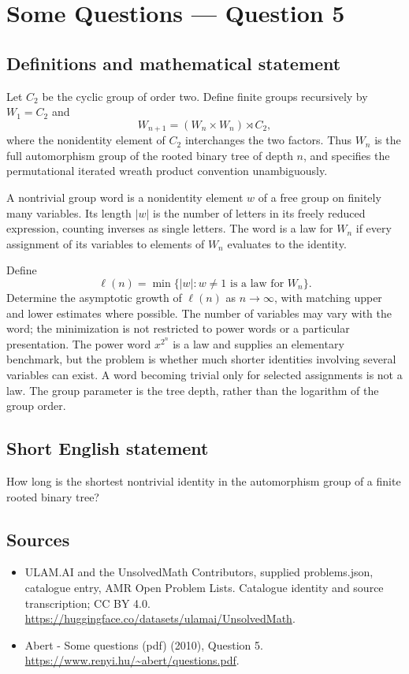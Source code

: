 \documentclass[11pt,a4paper]{article}
\begin{document}
\section*{Some Questions — Question 5}\label{statement}

\subsection{Definitions and mathematical statement}
Let $C_2$ be the cyclic group of order two. Define finite groups recursively by $W_1=C_2$ and
\[
 W_{n+1}=(W_n\times W_n)\rtimes C_2,
\]
where the nonidentity element of $C_2$ interchanges the two factors. Thus $W_n$ is the full automorphism group of the rooted binary tree of depth $n$, and specifies the permutational iterated wreath product convention unambiguously.

A nontrivial group word is a nonidentity element $w$ of a free group on finitely many variables. Its length $|w|$ is the number of letters in its freely reduced expression, counting inverses as single letters. The word is a law for $W_n$ if every assignment of its variables to elements of $W_n$ evaluates to the identity.

Define
\[
 \ell(n)=\min\{|w|:w\ne1\text{ is a law for }W_n\}.
\]
Determine the asymptotic growth of $\ell(n)$ as $n\to\infty$, with matching upper and lower estimates where possible. The number of variables may vary with the word; the minimization is not restricted to power words or a particular presentation. The power word $x^{2^n}$ is a law and supplies an elementary benchmark, but the problem is whether much shorter identities involving several variables can exist. A word becoming trivial only for selected assignments is not a law. The group parameter is the tree depth, rather than the logarithm of the group order.
\subsection{Short English statement}
How long is the shortest nontrivial identity in the automorphism group of a finite rooted binary tree?
\subsection{Sources}
\begin{itemize}
\item[S1] ULAM.AI and the UnsolvedMath Contributors, supplied problems.json, catalogue entry, AMR Open Problem Lists. Catalogue identity and source transcription; CC BY 4.0.
\url{https://huggingface.co/datasets/ulamai/UnsolvedMath}.
\item[S2] Abert - Some questions (pdf) (2010), Question 5. 
\url{https://www.renyi.hu/~abert/questions.pdf}.
\end{itemize}
\end{document}
